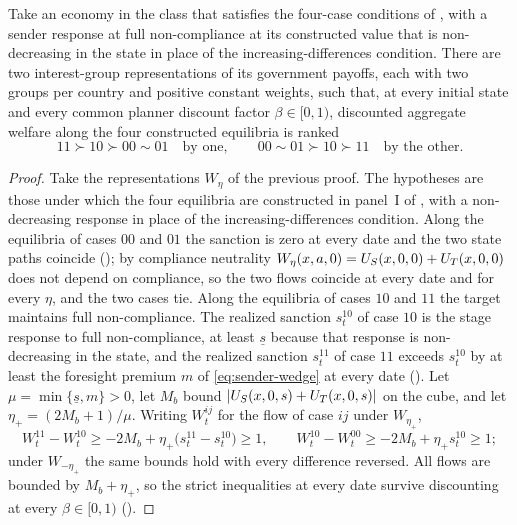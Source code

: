 \begin{proposition}
\label{prop:welfare-nonidentification-four}
Take an economy in the class that satisfies the four-case conditions of
, with a sender response at full non-compliance at its constructed
value that is non-decreasing in the state in place of the increasing-differences
condition. There are two interest-group representations of its government payoffs,
each with two groups per country and positive constant weights, such that, at every
initial state and every common planner discount factor $\beta\in[0,1)$, discounted
aggregate welfare along the four constructed equilibria is ranked
\[
11\succ10\succ00\sim01\quad\text{by one},\qquad
00\sim01\succ10\succ11\quad\text{by the other}.
\]
\end{proposition}

\begin{proof}
Take the representations $W_\eta$ of the previous proof. The hypotheses are those
under which the four equilibria are constructed in panel~I of
, with a non-decreasing response in place of the increasing-differences condition. Along the equilibria of cases $00$ and $01$ the sanction
is zero at every date and the two state paths coincide
(); by compliance neutrality
$W_\eta(x,a,0)=U_S(x,0,0)+U_T(x,0,0)$ does not depend on compliance, so the two
flows coincide at every date and for every $\eta$, and the two cases tie. Along the
equilibria of cases $10$ and $11$ the target maintains full non-compliance. The realized sanction
$s^{10}_t$ of case $10$ is the stage response to full non-compliance, at least
$\underline s$ because that response is non-decreasing in the state, and the
realized sanction $s^{11}_t$ of case $11$ exceeds $s^{10}_t$ by at least the foresight premium
$m$ of \eqref{eq:sender-wedge} at every date
(). Let
$\mu=\min\{\underline s,m\}>0$, let $M_b$ bound $|U_S(x,0,s)+U_T(x,0,s)|$ on the
cube, and let $\eta_+=(2M_b+1)/\mu$. Writing $W^{ij}_t$ for the flow of case $ij$
under $W_{\eta_+}$,
\[
W^{11}_t-W^{10}_t\ge-2M_b+\eta_+\bigl(s^{11}_t-s^{10}_t\bigr)\ge1,
\qquad
W^{10}_t-W^{00}_t\ge-2M_b+\eta_+s^{10}_t\ge1 ;
\]
under $W_{-\eta_+}$ the same bounds hold with every difference reversed. All
flows are bounded by $M_b+\eta_+$, so the strict inequalities at every date
survive discounting at every $\beta\in[0,1)$
().
\end{proof}

